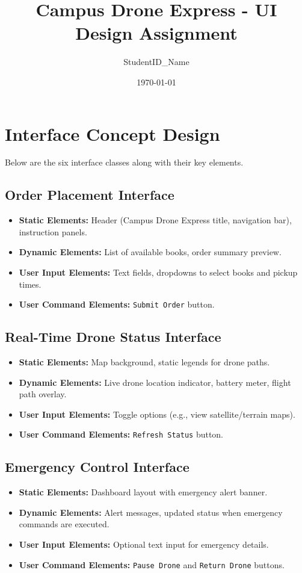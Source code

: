 \documentclass{article}
\title{Campus Drone Express - UI Design Assignment}
\author{StudentID\_Name}
\date{\today}
\begin{document}
\maketitle

\section{Interface Concept Design}
Below are the six interface classes along with their key elements.

\subsection{Order Placement Interface}
\begin{itemize}
    \item \textbf{Static Elements:} Header (Campus Drone Express title, navigation bar), instruction panels.
    \item \textbf{Dynamic Elements:} List of available books, order summary preview.
    \item \textbf{User Input Elements:} Text fields, dropdowns to select books and pickup times.
    \item \textbf{User Command Elements:} \texttt{Submit Order} button.
\end{itemize}

\subsection{Real-Time Drone Status Interface}
\begin{itemize}
    \item \textbf{Static Elements:} Map background, static legends for drone paths.
    \item \textbf{Dynamic Elements:} Live drone location indicator, battery meter, flight path overlay.
    \item \textbf{User Input Elements:} Toggle options (e.g., view satellite/terrain maps).
    \item \textbf{User Command Elements:} \texttt{Refresh Status} button.
\end{itemize}

\subsection{Emergency Control Interface}
\begin{itemize}
    \item \textbf{Static Elements:} Dashboard layout with emergency alert banner.
    \item \textbf{Dynamic Elements:} Alert messages, updated status when emergency commands are executed.
    \item \textbf{User Input Elements:} Optional text input for emergency details.
    \item \textbf{User Command Elements:} \texttt{Pause Drone} and \texttt{Return Drone} buttons.
\end{itemize}
\end{document}

